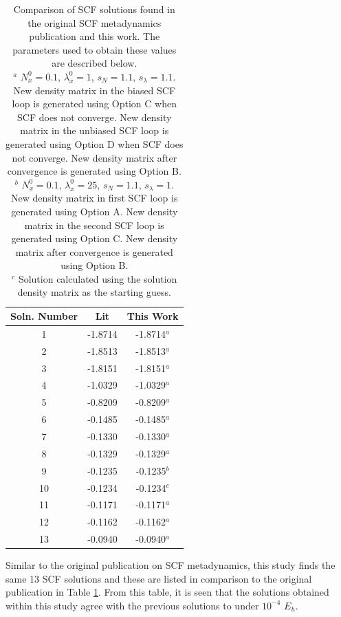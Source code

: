 \documentclass[final,3p,times,twocolumn]{elsarticle}
\begin{document}
\begin{table}
\centering
\begin{tabular}{c|cc} \hline\hline
Soln. Number & Lit\cite{scfmd} & This Work \\ \hline
1 & -1.8714 & -1.8714$^a$ \\
2 & -1.8513 & -1.8513$^a$ \\
3 & -1.8151 & -1.8151$^a$ \\
4 & -1.0329 & -1.0329$^a$ \\
5 & -0.8209 & -0.8209$^a$ \\
6 & -0.1485 & -0.1485$^a$ \\
7 & -0.1330 & -0.1330$^a$ \\
8 & -0.1329 & -0.1329$^a$ \\
9 & -0.1235 & -0.1235$^b$ \\
10 & -0.1234 & -0.1234$^c$ \\
11 & -0.1171 & -0.1171$^a$ \\
12 & -0.1162 & -0.1162$^a$ \\
13 & -0.0940 & -0.0940$^a$ \\ \hline\hline
\end{tabular}
\caption{Comparison of SCF solutions found in the original SCF metadynamics publication\cite{scfmd} and this work. The parameters used to obtain these values are described below.\\
$^a$ $N_x^0 = 0.1$, $\lambda_x^0 = 1$, $s_N = 1.1$, $s_\lambda = 1.1$. New density matrix in the biased SCF loop is generated using Option C when SCF does not converge. New density matrix in the unbiased SCF loop is generated using Option D when SCF does not converge. New density matrix after convergence is generated using Option B.\\
$^b$ $N_x^0 = 0.1$, $\lambda_x^0 = 25$, $s_N = 1.1$, $s_\lambda = 1$. New density matrix in first SCF loop is generated using Option A. New density matrix in the second SCF loop is generated using Option C. New density matrix after convergence is generated using Option B.\\
$^c$ Solution calculated using the solution density matrix as the starting guess.}
\label{tab:h4results}
\end{table}

Similar to the original publication on SCF metadynamics,\cite{scfmd} this study finds the same 13 SCF solutions and these are listed in comparison to the original publication in Table \ref{tab:h4results}. From this table, it is seen that the solutions obtained within this study agree with the previous solutions to under $10^{-4}$ $E_h$. 
\end{document}
